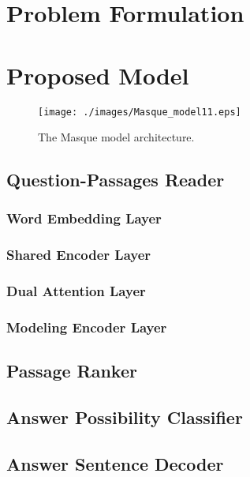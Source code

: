 \documentclass[11pt,a4paper]{article}
\theoremstyle{mydef}
\theoremstyle{myprob}
\begin{document}
\section{Problem Formulation}

\section{Proposed Model} 

\begin{figure}[t!]
\centering
\texttt{[image: ./images/Masque\_model11.eps]}
\caption{The Masque model architecture.}
\label{fig:model}
\end{figure}

\subsection{Question-Passages Reader}

\subsubsection{Word Embedding Layer}

\subsubsection{Shared Encoder Layer}

\subsubsection{Dual Attention Layer}

\subsubsection{Modeling Encoder Layer}

\subsection{Passage Ranker}

\subsection{Answer Possibility Classifier}

\subsection{Answer Sentence Decoder}
\end{document}
